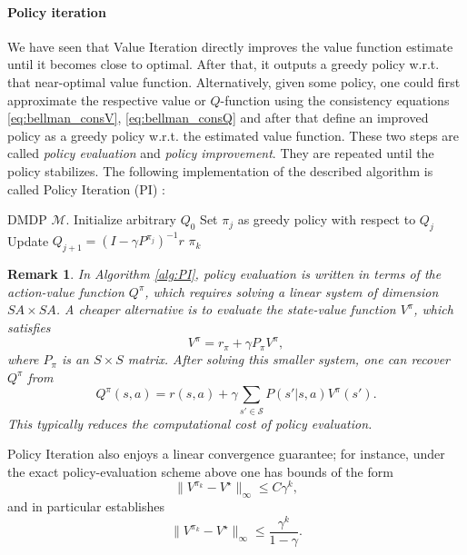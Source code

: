 \documentclass{article}
\numberwithin{equation}{section}
\newtheorem{remark}{Remark}
\newcommand{\cM}{\mathcal{M}}
\newcommand{\cS}{\mathcal{S}}
\begin{document}
\paragraph{Policy iteration}
We have seen that Value Iteration directly improves the value function estimate until it becomes close to optimal. After that, it outputs a greedy policy w.r.t. that near-optimal value function. Alternatively, given some policy, one could first approximate the respective value or $Q$-function using the consistency equations \eqref{eq:bellman_consV}, \eqref{eq:bellman_consQ} and after that define an improved policy as a greedy policy w.r.t. the estimated value function. These two steps are called \textit{policy evaluation} and \textit{policy improvement}. They are repeated until the policy stabilizes. The following implementation of the described algorithm is called Policy Iteration (PI) \citep{howard:dp}:
\begin{algorithm}
	\caption{Policy Iteration (PI)}
	\begin{algorithmic}[1]
		\REQUIRE DMDP \(\cM \).
            \STATE Initialize arbitrary \(Q_0\)
            \STATE Set \(\pi_j\) as greedy policy with respect to \(Q_j\) 
            \STATE Update \(Q_{j+1} = (I-\gamma P^{\pi_j})^{-1}r\) \label{line:policy_eval}
        \ENDFOR
	\RETURN $\pi_{k}$
	\end{algorithmic}
    \label{alg:PI}
\end{algorithm}

\begin{remark}\label{remark_policy_iteration}
In Algorithm \ref{alg:PI}, policy evaluation is written in terms of the action-value function \(Q^\pi\), which requires solving a linear system of dimension \(SA\times SA\). A cheaper alternative is to evaluate the state-value function \(V^\pi\), which satisfies
\[
V^\pi = r_\pi + \gamma P_\pi V^\pi ,
\]
where \(P_\pi\) is an \(S\times S\) matrix. After solving this smaller system, one can recover \(Q^\pi\) from
\[
Q^\pi(s,a)=r(s,a)+\gamma\sum_{s'\in\cS}P(s'|s,a)V^\pi(s').
\]
This typically reduces the computational cost of policy evaluation.
\end{remark}
Policy Iteration also enjoys a linear convergence guarantee; for instance, under the exact policy-evaluation scheme above one has bounds of the form
\[
\|V^{\pi_k}-V^\star\|_\infty \le C\gamma^k,
\]
and in particular \citep{scherrer2013improved} establishes
\[
\|V^{\pi_k}-V^\star\|_\infty \le \frac{\gamma^k}{1-\gamma}.
\]
\end{document}
